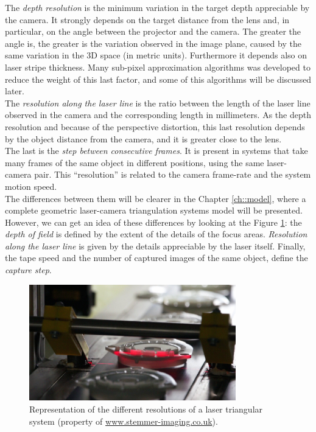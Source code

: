 \noindent
The \textit{depth resolution} is the minimum variation in the target depth appreciable by the camera. It strongly depends on the target distance from the lens and, in particular, on the angle between the projector and the camera. The greater the angle is, the greater is the variation observed in the image plane, caused by the same variation in the 3D space (in metric units). Furthermore it depends also on laser stripe thickness. Many sub-pixel approximation algorithms was developed to reduce the weight of this last factor, and some of this algorithms will be discussed later. \\

\noindent
The \textit{resolution along the laser line} is the ratio between the length of the laser line observed in the camera and the corresponding length in millimeters. As the depth resolution and because of the perspective distortion, this last resolution depends by the object distance from the camera, and it is greater close to the lens. \\

\noindent
The last is the \textit{step between consecutive frames}.
It is present in systems that take many frames of the same object in different positions, using the same laser-camera pair. This ``resolution'' is related to the camera frame-rate and the system motion speed. \\

\noindent
The differences between them will be clearer in the Chapter \ref{ch::model}, where a complete geometric laser-camera triangulation systems model will be presented. However, we can get an idea of these differences by looking at the Figure \ref{fig:tech:resolutions}: the \textit{depth of field} is defined by the extent of the details of the focus areas. \textit{Resolution along the laser line} is given by the details appreciable by the laser itself. Finally, the tape speed and the number of captured images of the same object, define the \textit{capture step}.
  \begin{figure}[t!]
    \centering
    \includegraphics[width=0.8\textwidth]{./images/tech/resolutions.JPG}
    \caption{Representation of the different resolutions of a laser triangular system (property of \url{www.stemmer-imaging.co.uk}).}
    \label{fig:tech:resolutions}
  \end{figure}


